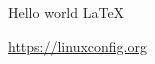\documentclass{article}
\begin{document}
	Hello world \LaTeX
	
	\url{https://linuxconfig.org}
\end{document}
